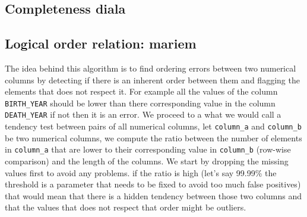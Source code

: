 \documentclass{article}
\begin{document}

\subsection{Completeness diala} %
\label{sub:Completeness}


\subsection{Logical order relation: mariem} %
\label{sub:Logical order relation}
The idea behind this algorithm is to find ordering errors between two numerical columns by detecting if there is an inherent order between them and flagging the elements that does not respect it. For example all the values of the column \texttt{BIRTH\_YEAR} should be lower than there corresponding value in the column \texttt{DEATH\_YEAR} if not then it is an error. We proceed to a what we would call a tendency test between pairs of all numerical columns, let \texttt{column\_a} and \texttt{column\_b} be two numerical columns, we compute the ratio between the number of elements in \texttt{column\_a} that are lower to their corresponding value in \texttt{column\_b} (row-wise comparison) and the length of the columns. We start by dropping the missing values first to avoid any problems. if the ratio is high (let's say 99.99\% the threshold is a parameter that needs to be fixed to avoid too much false positives) that would mean that there is a hidden tendency between those two columns and that the values that does not respect that order might be outliers.
\end{document}

